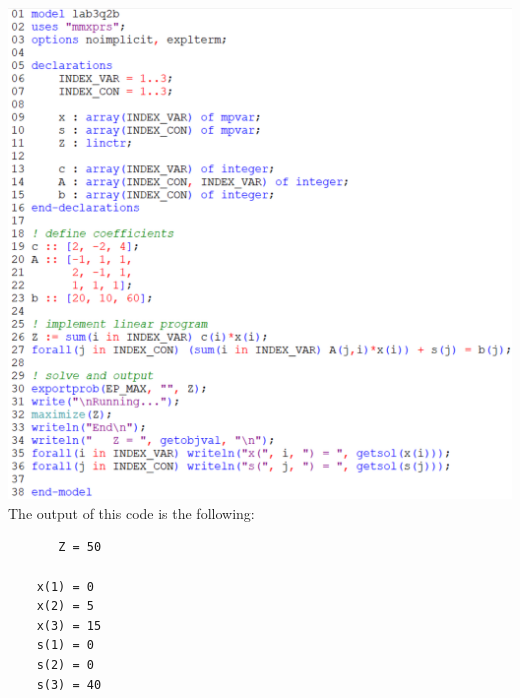\documentclass[12pt]{article}
\theoremstyle{definition}
\begin{document}
\includegraphics[scale=0.7]{code2b.png}\\
The output of this code is the following:
\begin{lstlisting}
       Z = 50
    
    x(1) = 0
    x(2) = 5
    x(3) = 15
    s(1) = 0
    s(2) = 0
    s(3) = 40
\end{lstlisting}
\end{document}
